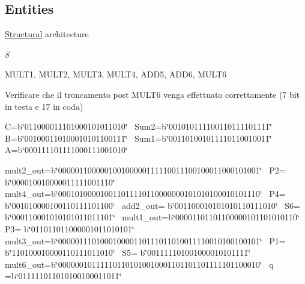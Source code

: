 \subsection*{Entities}
\begin{DoxyCompactItemize}
\item 
\hyperlink{class_linear_regression_1_1_structural}{Structural} architecture
\begin{DoxyCompactList}\small\item\em 8 

M\+U\+L\+T1, M\+U\+L\+T2, M\+U\+L\+T3, M\+U\+L\+T4, A\+D\+D5, A\+D\+D6, M\+U\+L\+T6 

Verificare che il troncamento post M\+U\+L\+T6 venga effettuato correttamente (7 bit in testa e 17 in coda) 

C=b\char`\"{}011000011101000101011010\char`\"{}~\newline
 Sum2=b\char`\"{}001010111100110111101111\char`\"{}~\newline
 B=b\char`\"{}001000110100010101100111\char`\"{}~\newline
 Sum1=b\char`\"{}001101001011110110010011\char`\"{}~\newline
 A=b\char`\"{}000111101111000111001010\char`\"{}  

mult2\+\_\+out=b\char`\"{}000001100000100100000111110011100100011000101001\char`\"{}~\newline
 P2= b\char`\"{}000010010000011111001110\char`\"{}~\newline
 mult4\+\_\+out=b\char`\"{}000101000010011011110110000000101010100010101110\char`\"{}~\newline
 P4= b\char`\"{}001010000100110111101100\char`\"{}~\newline
 add2\+\_\+out= b\char`\"{}001100010101010110111010\char`\"{}~\newline
 S6= b\char`\"{}000110001010101011011101\char`\"{}~\newline
 mult1\+\_\+out=b\char`\"{}00001101101100000101101010110\char`\"{}~\newline
 P3= b\char`\"{}011011011000001011010101\char`\"{}~\newline
 mult3\+\_\+out=b\char`\"{}000001110100010000110111011010011110010100100101\char`\"{}~\newline
 P1= b\char`\"{}110100010000110111011010\char`\"{}~\newline
 S5= b\char`\"{}001111101001000010101111\char`\"{}~\newline
 mult6\+\_\+out=b\char`\"{}000000101111101101010010001101101101111101100010\char`\"{}~\newline
 q =b\char`\"{}011111011010100100011011\char`\"{}  


\end{DoxyCompactList}
\end{DoxyCompactItemize}
